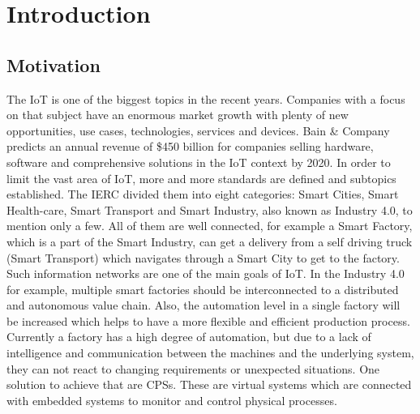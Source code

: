 \chapter{Introduction}
\minitoc\vspace{.5cm}

\section{Motivation}

The \ac{IoT} is one of the biggest topics in the recent years.
Companies with a focus on that subject have an enormous market growth with plenty of new opportunities, use cases, technologies, services and devices.
Bain \& Company predicts an annual revenue of \$450 billion for companies selling hardware, software and comprehensive solutions in the \ac{IoT} context by 2020.\autocite{Bosche:2016}
In order to limit the vast area of \ac{IoT}, more and more standards are defined and subtopics established.
The \ac{IERC} divided them into eight categories: Smart Cities, Smart Health-care, Smart Transport and Smart Industry, also known as Industry 4.0, to mention only a few.\autocite[cf.][p. 7]{IERC:2011}
All of them are well connected, for example a Smart Factory, which is a part of the Smart Industry, can get a delivery from a self driving truck (Smart Transport) which navigates through a Smart City to get to the factory.
Such information networks are one of the main goals of \ac{IoT}.
In the Industry 4.0 for example, multiple smart factories should be interconnected to a distributed and autonomous value chain.
Also, the automation level in a single factory will be increased which helps to have a more flexible and efficient production process.
Currently a factory has a high degree of automation, but due to a lack of intelligence and communication between the machines and the underlying system, they can not react to changing requirements or unexpected situations.
One solution to achieve that are \acp{CPS}.
These are virtual systems which are connected with embedded systems to monitor and control physical processes.\autocite[cf.][p. 363]{Lee:2008}
